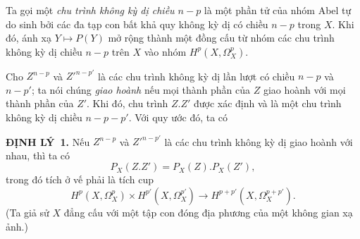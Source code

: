 \documentclass[11pt,twoside,openany]{book}
\numberwithin{equation}{section}
\newcommand{\src}[1]{%
  \phantomsection\hypertarget{src:\fgasourceid:#1}{}%
  \marginpar{\raggedleft\footnotesize\sffamily #1}%
}
\newcommand{\fgasourceid}{unset}
\newcommand{\result}[2]{\par\medskip\noindent\textbf{#1\if\relax\detokenize{#2}\relax\else\ #2\fi.}\quad}
\begin{document}
Ta gọi một \emph{chu trình không kỳ dị chiều $n-p$} là một phần tử của nhóm
Abel tự do sinh bởi các đa tạp con bất khả quy không kỳ dị có
chiều $n-p$ trong $X$. Khi đó, ánh xạ $Y\longmapsto P(Y)$ mở rộng thành
một đồng cấu từ nhóm các chu trình không kỳ dị chiều $n-p$ trên $X$
vào nhóm $H^{p}(X,\Omega_X^{p})$.

Cho $Z^{n-p}$ và $Z'^{n-p'}$ là các chu trình không kỳ dị lần lượt có chiều $n-p$ và
$n-p'$; ta nói chúng \emph{giao hoành} nếu mọi thành phần
của $Z$ giao hoành với mọi thành phần của $Z'$. Khi đó, chu trình $Z.Z'$ được
xác định và là một chu trình không kỳ dị chiều $n-p-p'$. Với quy ước đó, ta có


\src{179}
\result{ĐỊNH LÝ}{1} Nếu $Z^{n-p}$ và $Z'^{n-p'}$ là các chu trình không kỳ dị giao hoành với nhau, thì ta có
\begin{equation}\tag{4.4}
  P_X(Z.Z')=P_X(Z).P_X(Z'),
\end{equation}
trong đó tích ở vế phải là tích cup
\[
  H^{p}(X,\Omega_X^{p})\times H^{p'}(X,\Omega_X^{p'})
  \longrightarrow H^{p+p'}(X,\Omega_X^{p+p'}).
\]
(Ta giả sử $X$ đẳng cấu với một tập con đóng địa phương của một không gian
xạ ảnh.)
\end{document}
